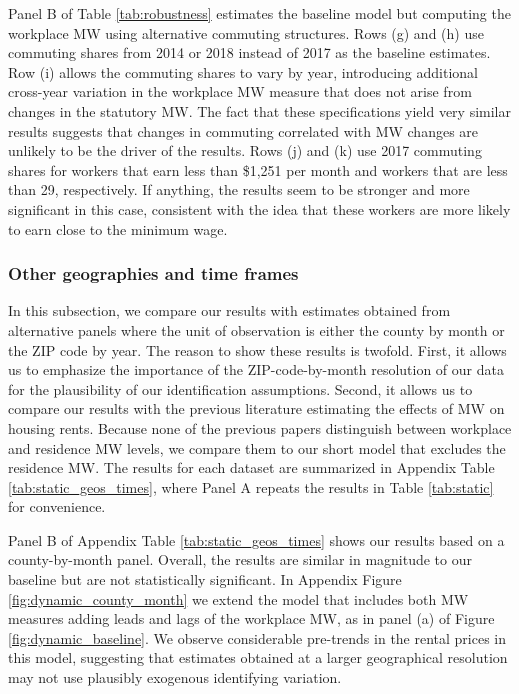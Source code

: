 Panel B of Table \ref{tab:robustness} estimates the baseline model but 
computing the workplace MW using alternative commuting structures.
Rows (g) and (h) use commuting shares from 2014 or 2018 instead of 2017 as 
the baseline estimates.
Row (i) allows the commuting shares to vary by year, introducing additional
cross-year variation in the workplace MW measure that does not arise from 
changes in the statutory MW.
The fact that these specifications yield very similar results suggests that 
changes in commuting correlated with MW changes are unlikely to be the driver
of the results.
Rows (j) and (k) use 2017 commuting shares for workers that earn less than 
\$1,251 per month and workers that are less than 29, respectively.
If anything, the results seem to be stronger and more significant in this case, 
consistent with the idea that these workers are more likely to earn close to the 
minimum wage.

\subsubsection*{Other geographies and time frames}

In this subsection, we compare our results with estimates obtained from 
alternative panels where the unit of observation is either the county by month 
or the ZIP code by year.
The reason to show these results is twofold.
First, it allows us to emphasize the importance of the ZIP-code-by-month 
resolution of our data for the plausibility of our identification assumptions.
Second, it allows us to compare our results with the previous literature 
estimating the effects of MW on housing rents.
Because none of the previous papers distinguish between workplace and residence
MW levels, we compare them to our short model that excludes the residence MW.
The results for each dataset are summarized in Appendix Table 
\ref{tab:static_geos_times}, where Panel A repeats the results in Table 
\ref{tab:static} for convenience.

Panel B of Appendix Table \ref{tab:static_geos_times} shows our results based 
on a county-by-month panel.
Overall, the results are similar in magnitude to our baseline but are not
statistically significant.
In Appendix Figure \ref{fig:dynamic_county_month} we extend the model
that includes both MW measures adding leads and lags of the workplace MW, as
in panel (a) of Figure \ref{fig:dynamic_baseline}.
We observe considerable pre-trends in the rental prices in this model,
suggesting that estimates obtained at a larger geographical resolution may not 
use plausibly exogenous identifying variation.

